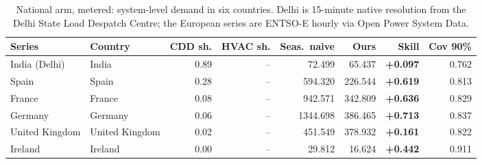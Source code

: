 \begin{table}[t]
\centering
\scriptsize
\setlength{\tabcolsep}{3pt}
\begin{tabular}{llrrrrrr}
\toprule
Series & Country & CDD sh. & HVAC sh. & Seas.\ naive & Ours & Skill & Cov 90\% \\
\midrule
India (Delhi) & India & 0.89 & -- & 72.499 & 65.437 & \textbf{+0.097} & 0.762 \\
Spain & Spain & 0.28 & -- & 594.320 & 226.544 & \textbf{+0.619} & 0.813 \\
France & France & 0.08 & -- & 942.571 & 342.809 & \textbf{+0.636} & 0.829 \\
Germany & Germany & 0.06 & -- & 1344.698 & 386.465 & \textbf{+0.713} & 0.837 \\
United Kingdom & United Kingdom & 0.02 & -- & 451.549 & 378.932 & \textbf{+0.161} & 0.822 \\
Ireland & Ireland & 0.00 & -- & 29.812 & 16.624 & \textbf{+0.442} & 0.911 \\
\bottomrule
\end{tabular}
\caption{National arm, metered: system-level demand in six countries. Delhi is 15-minute native resolution from the Delhi State Load Despatch Centre; the European series are ENTSO-E hourly via Open Power System Data.}
\label{tab:national}
\end{table}
